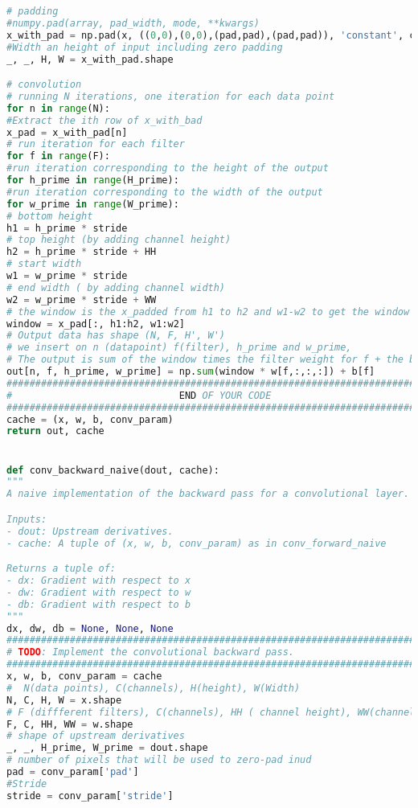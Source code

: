 \begin{lstlisting}[language=Python, label=lst:layers.py, caption={layers.py}, basicstyle=\tiny]
# padding
#numpy.pad(array, pad_width, mode, **kwargs)
x_with_pad = np.pad(x, ((0,0),(0,0),(pad,pad),(pad,pad)), 'constant', constant_values=0)
#Width an height of input including zero padding
_, _, H, W = x_with_pad.shape

# convolution
# running N iterations, one iteration for each data point
for n in range(N):
#Extract the ith row of x_with_bad
x_pad = x_with_pad[n]
# run iteration for each filter
for f in range(F):
#run iteration corresponding to the height of the output
for h_prime in range(H_prime):
#run iteration corresponding to the width of the output
for w_prime in range(W_prime):
# bottom height
h1 = h_prime * stride
# top height (by adding channel height)
h2 = h_prime * stride + HH
# start width
w1 = w_prime * stride
# end width ( by adding channel width)
w2 = w_prime * stride + WW
# the window is the x_padded from h1 to h2 and w1-w2 to get the window
window = x_pad[:, h1:h2, w1:w2]
# Output data has shape (N, F, H', W') 
# we insert on n (datapoint) f(filter), h_prime and w_prime, 
# The output is sum of the window times the filter weight for f + the bias for f
out[n, f, h_prime, w_prime] = np.sum(window * w[f,:,:,:]) + b[f]
#############################################################################
#                             END OF YOUR CODE                              #
#############################################################################
cache = (x, w, b, conv_param)
return out, cache


def conv_backward_naive(dout, cache):
"""
A naive implementation of the backward pass for a convolutional layer.

Inputs:
- dout: Upstream derivatives.
- cache: A tuple of (x, w, b, conv_param) as in conv_forward_naive

Returns a tuple of:
- dx: Gradient with respect to x
- dw: Gradient with respect to w
- db: Gradient with respect to b
"""
dx, dw, db = None, None, None
#############################################################################
# TODO: Implement the convolutional backward pass.                          #
#############################################################################
x, w, b, conv_param = cache
#  N(data points), C(channels), H(height), W(Width)
N, C, H, W = x.shape
# F (diffferent filters), C(channels), HH ( channel height), WW(channel width)
F, C, HH, WW = w.shape
# shape of upstream derivatives
_, _, H_prime, W_prime = dout.shape
# number of pixels that will be used to zero-pad inud
pad = conv_param['pad']
#Stride
stride = conv_param['stride']


\end{lstlisting}

